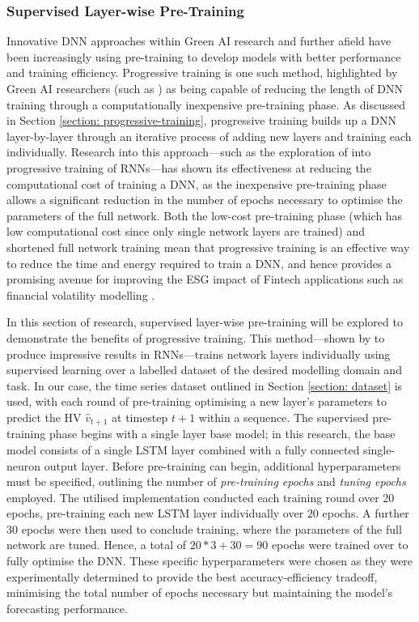 \documentclass[a4paper, 11pt]{report}
\begin{document}
    \subsubsection{Supervised Layer-wise Pre-Training}
    
    Innovative DNN approaches within Green AI research and further afield have been increasingly using pre-training to develop models with better performance and training efficiency. Progressive training is one such method, highlighted by Green AI researchers (such as \citet{xu-2021}) as being capable of reducing the length of DNN training through a computationally inexpensive pre-training phase. As discussed in Section \ref{section: progressive-training}, progressive training builds up a DNN layer-by-layer through an iterative process of adding new layers and training each individually. Research into this approach---such as the exploration of \citet{ienco-2019} into progressive training of RNNs---has shown its effectiveness at reducing the computational cost of training a DNN, as the inexpensive pre-training phase allows a significant reduction in the number of epochs necessary to optimise the parameters of the full network. Both the low-cost pre-training phase (which has low computational cost since only single network layers are trained) and shortened full network training mean that progressive training is an effective way to reduce the time and energy required to train a DNN, and hence provides a promising avenue for improving the ESG impact of Fintech applications such as financial volatility modelling \citep{xu-2021}.

    In this section of research, supervised layer-wise pre-training will be explored to demonstrate the benefits of progressive training. This method---shown by \citet{ienco-2019} to produce impressive results in RNNs---trains network layers individually using supervised learning over a labelled dataset of the desired modelling domain and task. In our case, the time series dataset outlined in Section \ref{section: dataset} is used, with each round of pre-training optimising a new layer’s parameters to predict the HV $\hat{v}_{t+1}$ at timestep $t+1$ within a sequence. The supervised pre-training phase begins with a single layer base model; in this research, the base model consists of a single LSTM layer combined with a fully connected single-neuron output layer. Before pre-training can begin, additional hyperparameters must be specified, outlining the number of \emph{pre-training epochs} and \emph{tuning epochs} employed. The utilised implementation conducted each training round over 20 epochs, pre-training each new LSTM layer individually over $20$ epochs. A further $30$ epochs were then used to conclude training, where the parameters of the full network are tuned. Hence, a total of $20 * 3 + 30 = 90$ epochs were trained over to fully optimise the DNN. These specific hyperparameters were chosen as they were experimentally determined to provide the best accuracy-efficiency tradeoff, minimising the total number of epochs necessary but maintaining the model's forecasting performance. 
\end{document}
